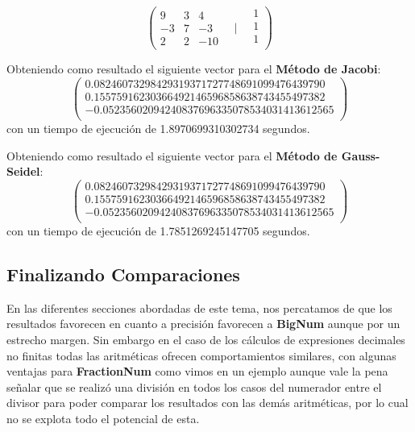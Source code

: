 \documentclass[a4paper,10pt,twocolumn]{article}
\begin{document}
	\begin{equation}	
		\left(	
		\begin{matrix}
			9  &  3  &  4\\
            	-3 &  7  & -3\\
            	2  &  2  &-10 
		\end{matrix}
		\quad\Bigg|\quad
		\begin{matrix}
			1\\
			1\\
			1\\
		\end{matrix}
		\right)
	\end{equation}
	
	Obteniendo como resultado el siguiente vector para el \textbf{Método de Jacobi}:
	$$	
		\left(	
		\begin{matrix}
			0.08246073298429319371727748691099476439790\\ 								0.15575916230366492146596858638743455497382\\ 								-0.05235602094240837696335078534031413612565\\
		\end{matrix}
		\right)
	$$ con un tiempo de ejecución de 1.8970699310302734 segundos.
	
	Obteniendo como resultado el siguiente vector para el \textbf{Método de Gauss-Seidel}:
	$$	
		\left(	
		\begin{matrix}
			0.08246073298429319371727748691099476439790\\ 								0.15575916230366492146596858638743455497382\\ 								-0.05235602094240837696335078534031413612565\\
		\end{matrix}
		\right)
	$$ con un tiempo de ejecución de 1.7851269245147705 segundos.
	
\subsection{Finalizando Comparaciones}\label{sub:big}
	En las diferentes secciones abordadas de este tema, nos percatamos de que los resultados favorecen en cuanto a precisión favorecen a \textbf{BigNum} aunque por un estrecho margen. Sin embargo en el caso de los cálculos de expresiones decimales no finitas todas las aritméticas ofrecen comportamientos similares, con algunas ventajas para \textbf{FractionNum} como vimos en un ejemplo aunque vale la pena señalar que se realizó una división en todos los casos del numerador entre el divisor para poder comparar los resultados con las demás aritméticas, por lo cual no se explota todo el potencial de esta.
	
\end{document}
